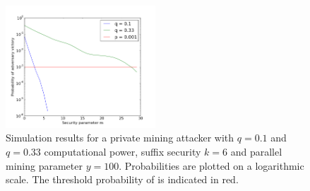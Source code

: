 \begin{figure}[h]
    \caption{\label{fig.nipopow-attack-experiment}
        Simulation results for a private mining attacker with $q = 0.1$ and $q
        = 0.33$ computational power, suffix security $k = 6$ and parallel
        mining parameter $y = 100$. Probabilities are plotted on a logarithmic
        scale. The threshold probability of \cite{bitcoin} is indicated in red.
    }
    \centering
    \includegraphics[width=0.5\textwidth,keepaspectratio]{figures/nipopow-attack-experiment.png}
\end{figure}

